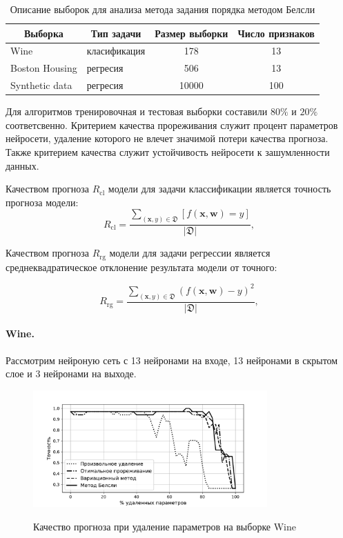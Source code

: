 \begin{table}[h]

\begin{center}
\caption{Описание выборок для анализа метода задания порядка методом Белсли}
\begin{tabular}{|c|c|c|c|}
\hline
	Выборка &Тип задачи& Размер выборки& Число признаков\\
	\hline
	
	\multicolumn{1}{|l|}{Wine}
	&
	\multicolumn{1}{|l|}{класификация}
	 & 178 & 13\\
	\hline
	
	\multicolumn{1}{|l|}{Boston Housing}
	&
	\multicolumn{1}{|l|}{регресия}
	& 506 & 13\\
	\hline
	
	\multicolumn{1}{|l|}{Synthetic data}
	&
	\multicolumn{1}{|l|}{регресия}
	& 10000 & 100\\
\hline

\end{tabular}
\end{center}
\end{table}



Для алгоритмов тренировочная и тестовая выборки составили $80\%$ и $20\%$ соответсвенно. Критерием качества прореживания служит процент параметров нейросети, удаление которого не влечет значимой потери качества прогноза. Также критерием качества служит устойчивость нейросети к зашумленности данных. 

Качеством прогноза $R_{\text{cl}}$ модели для задачи классификации является точность прогноза модели:
\[
R_{\text{cl}} = \frac{\sum_{(\textbf{x},y)\in \mathfrak{D}} [f(\textbf{x}, \textbf{w}) = y]}{\left|\mathfrak{D}\right|},
\]

Качеством прогноза $R_{\text{rg}} $ модели для задачи регрессии является среднеквадратическое отклонение результата модели от точного:

\[
R_{\text{rg}} = \frac{\sum_{(\textbf{x},y)\in \mathfrak{D}} \left(f(\textbf{x}, \textbf{w}) - y\right)^2}{\left|\mathfrak{D}\right|},
\]

\paragraph{Wine.} Рассмотрим нейроную сеть с 13 нейронами на входе, 13 нейронами в скрытом слое и 3 нейронами на выходе.

\begin{figure}[h!t]\center
\includegraphics[width=0.8\textwidth]{results/relevant/Wine/All.pdf}\\
\caption{Качество прогноза при удаление параметров на выборке Wine}
\label{WineAll}
\end{figure}

